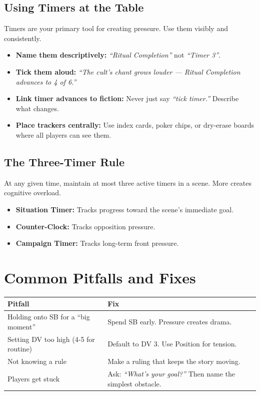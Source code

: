 \documentclass[11pt]{book}
\begin{document}
\subsection*{Using Timers at the Table}

Timers are your primary tool for creating pressure. Use them visibly and consistently.

\begin{itemize}
  \item \textbf{Name them descriptively:} \textit{``Ritual Completion''} not \textit{``Timer 3''}.
  \item \textbf{Tick them aloud:} \textit{``The cult's chant grows louder --- Ritual Completion advances to 4 of 6.''}
  \item \textbf{Link timer advances to fiction:} Never just say \textit{``tick timer.''} Describe what changes.
  \item \textbf{Place trackers centrally:} Use index cards, poker chips, or dry-erase boards where all players can see them.
\end{itemize}

\subsection*{The Three-Timer Rule}
At any given time, maintain at most three active timers in a scene. More creates cognitive overload.

\begin{itemize}
  \item \textbf{Situation Timer:} Tracks progress toward the scene's immediate goal.
  \item \textbf{Counter-Clock:} Tracks opposition pressure.
  \item \textbf{Campaign Timer:} Tracks long-term front pressure.
\end{itemize}

\section{Common Pitfalls and Fixes}

\begin{center}
\begin{tabular}{p{4cm}p{7cm}}
\toprule
\textbf{Pitfall} & \textbf{Fix} \\
\midrule
Holding onto SB for a ``big moment'' & Spend SB early. Pressure creates drama. \\
Setting DV too high (4-5 for routine) & Default to DV 3. Use Position for tension. \\
Not knowing a rule & Make a ruling that keeps the story moving. \\
Players get stuck & Ask: \textit{``What's your goal?''} Then name the simplest obstacle. \\
\bottomrule
\end{tabular}
\end{center}
\end{document}

